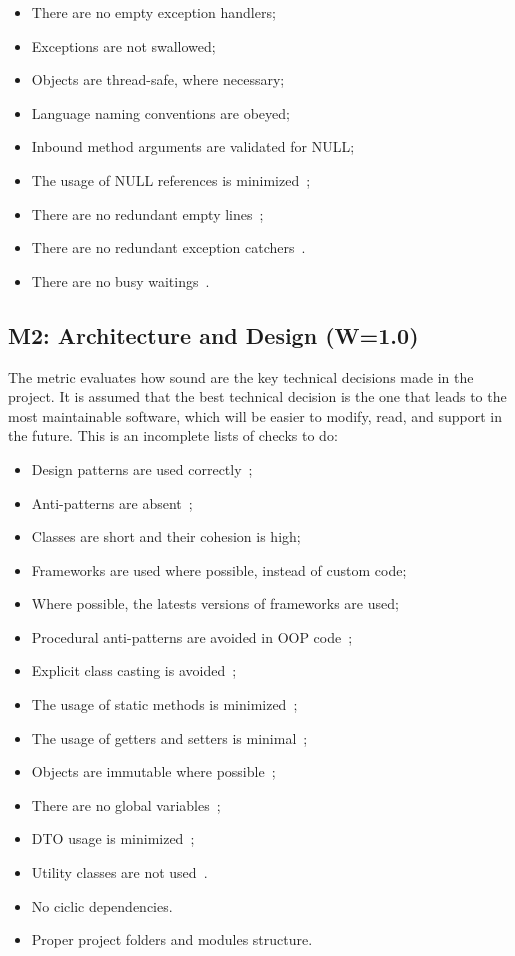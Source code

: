 \documentclass[12pt,oneside]{article}
\begin{document}
\begin{itemize}
\item There are no empty exception handlers;
\item Exceptions are not swallowed;
\item Objects are thread-safe, where necessary;
\item Language naming conventions are obeyed;
\item Inbound method arguments are validated for NULL;
\item The usage of NULL references is minimized~\citep{yb-null};
\item There are no redundant empty lines~\citep{yb-empty-lines};
\item There are no redundant exception catchers~\citep{yb-dont-catch}.
\item There are no busy waitings~\citep{so-busywait}.
\end{itemize}

\subsection{M2: Architecture and Design (W=1.0)}

The metric evaluates how sound are the key technical decisions made
in the project. It is assumed that the best technical decision is the
one that leads to the most maintainable software, which will be easier
to modify, read, and support in the future. This is an incomplete lists of
checks to do:

\begin{itemize}
\item Design patterns are used correctly~\citep{gamma1993design,holub2004holub,freeman2008head,fowler2003patterns};
\item Anti-patterns are absent~\citep{jaafar2013mining};
\item Classes are short and their cohesion is high;
\item Frameworks are used where possible, instead of custom code;
\item Where possible, the latests versions of frameworks are used;
\item Procedural anti-patterns are avoided in OOP code~\citep{yb-er};
\item Explicit class casting is avoided~\citep{yb-casting};
\item The usage of static methods is minimized~\citep{yb-static};
\item The usage of getters and setters is minimal~\citep{yb-getters};
\item Objects are immutable where possible~\citep{yb-immutability};
\item There are no global variables~\citep{yb-global-vars};
\item DTO usage is minimized~\citep{yb-dto};
\item Utility classes are not used~\citep{yb-utility}.
\item No ciclic dependencies.
\item Proper project folders and modules structure.
\end{itemize}
\end{document}
